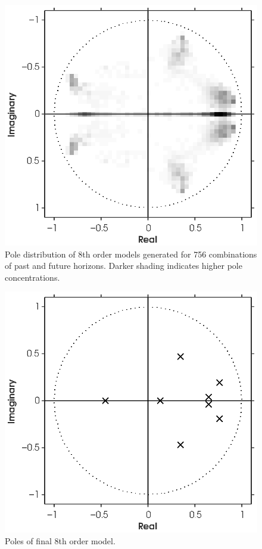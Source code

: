 \begin{figure}[htb!]
	\centering
	\includegraphics{../fig/poles_all.eps}
	\caption{Pole distribution of 8th order models generated for 756 combinations of past and future horizons. Darker shading indicates higher pole concentrations.}
	\label{fig:poles_all}
\end{figure}

\begin{figure}[htb!]
	\centering
	\includegraphics{../fig/poles_1760.eps}
	\caption{Poles of final 8th order model.}
	\label{fig:poles_1760}
\end{figure}




